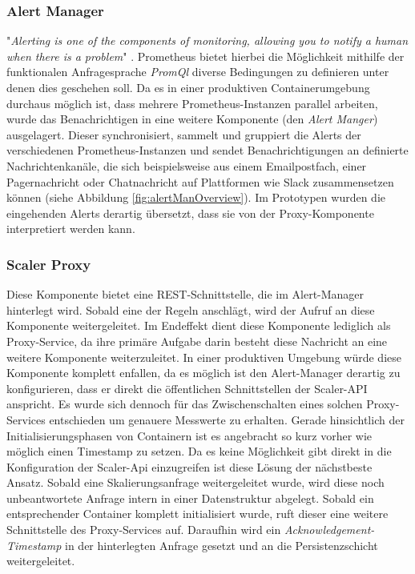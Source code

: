 \subsubsection{Alert Manager \checkmark}
"\emph{Alerting is one of the components of monitoring, allowing you to notify a human when there is a problem}" \cite[Seite~291]{oreillyPrometheus}. Prometheus bietet hierbei die Möglichkeit mithilfe der funktionalen Anfragesprache \emph{PromQl} diverse Bedingungen zu definieren unter denen dies geschehen soll. Da es in einer produktiven Containerumgebung durchaus möglich ist, dass mehrere Prometheus-Instanzen parallel arbeiten, wurde das Benachrichtigen in eine weitere Komponente (den \emph{Alert Manger}) ausgelagert. Dieser synchronisiert, sammelt und gruppiert die Alerts der verschiedenen Prometheus-Instanzen und sendet Benachrichtigungen an definierte Nachrichtenkanäle, die sich beispielsweise aus einem Emailpostfach, einer Pagernachricht oder Chatnachricht auf Plattformen wie Slack zusammensetzen können (siehe Abbildung \ref{fig:alertManOverview}). Im Prototypen wurden die eingehenden Alerts derartig übersetzt, dass sie von der Proxy-Komponente interpretiert werden kann.


\subsubsection{Scaler Proxy \checkmark}
Diese Komponente bietet eine REST-Schnittstelle, die im Alert-Manager hinterlegt wird. Sobald eine der Regeln anschlägt, wird der Aufruf an diese Komponente weitergeleitet. Im Endeffekt dient diese Komponente lediglich als Proxy-Service, da ihre primäre Aufgabe darin besteht diese Nachricht an eine weitere Komponente weiterzuleitet. In einer produktiven Umgebung würde diese Komponente komplett enfallen, da es möglich ist den Alert-Manager derartig zu konfigurieren, dass er direkt die öffentlichen Schnittstellen der Scaler-API anspricht. Es wurde sich dennoch für das Zwischenschalten eines solchen Proxy-Services entschieden um genauere Messwerte zu erhalten. Gerade hinsichtlich der Initialisierungsphasen von Containern ist es angebracht so kurz vorher wie möglich einen Timestamp zu setzen. Da es keine Möglichkeit gibt direkt in die Konfiguration der Scaler-Api einzugreifen ist diese Lösung der nächstbeste Ansatz. Sobald eine Skalierungsanfrage weitergeleitet wurde, wird diese noch unbeantwortete Anfrage intern in einer Datenstruktur abgelegt. Sobald ein entsprechender Container komplett initialisiert wurde, ruft dieser eine weitere Schnittstelle des Proxy-Services auf. Daraufhin wird ein \emph{Acknowledgement-Timestamp} in der hinterlegten Anfrage gesetzt und an die Persistenzschicht weitergeleitet. 

